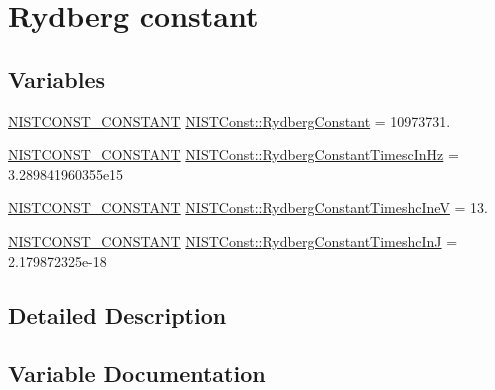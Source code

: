 \hypertarget{group___n_i_s_t_const-_rydberg_constant}{}\section{Rydberg constant}
\label{group___n_i_s_t_const-_rydberg_constant}
\subsection*{Variables}
\begin{DoxyCompactItemize}
\item 
\mbox{\hyperlink{group___n_i_s_t_const-_macros_ga2b0fc1d7452373f816175dd86ce26729}{N\+I\+S\+T\+C\+O\+N\+S\+T\+\_\+\+C\+O\+N\+S\+T\+A\+NT}} \mbox{\hyperlink{group___n_i_s_t_const-_rydberg_constant_ga5b5309c2cd540e1257add5555ea6b183}{N\+I\+S\+T\+Const\+::\+Rydberg\+Constant}} = 10973731.
\item 
\mbox{\hyperlink{group___n_i_s_t_const-_macros_ga2b0fc1d7452373f816175dd86ce26729}{N\+I\+S\+T\+C\+O\+N\+S\+T\+\_\+\+C\+O\+N\+S\+T\+A\+NT}} \mbox{\hyperlink{group___n_i_s_t_const-_rydberg_constant_gab36d2408665aafbb07042e7d1c945bb0}{N\+I\+S\+T\+Const\+::\+Rydberg\+Constant\+Timesc\+In\+Hz}} = 3.\+289841960355e15
\item 
\mbox{\hyperlink{group___n_i_s_t_const-_macros_ga2b0fc1d7452373f816175dd86ce26729}{N\+I\+S\+T\+C\+O\+N\+S\+T\+\_\+\+C\+O\+N\+S\+T\+A\+NT}} \mbox{\hyperlink{group___n_i_s_t_const-_rydberg_constant_ga25e0178ecaed69f077409ab82c45272d}{N\+I\+S\+T\+Const\+::\+Rydberg\+Constant\+Timeshc\+IneV}} = 13.
\item 
\mbox{\hyperlink{group___n_i_s_t_const-_macros_ga2b0fc1d7452373f816175dd86ce26729}{N\+I\+S\+T\+C\+O\+N\+S\+T\+\_\+\+C\+O\+N\+S\+T\+A\+NT}} \mbox{\hyperlink{group___n_i_s_t_const-_rydberg_constant_gaff757f4254c8c0db92b9aab166cfbeaf}{N\+I\+S\+T\+Const\+::\+Rydberg\+Constant\+Timeshc\+InJ}} = 2.\+179872325e-\/18
\end{DoxyCompactItemize}


\subsection{Detailed Description}


\subsection{Variable Documentation}
\mbox{\label{group___n_i_s_t_const-_rydberg_constant_ga5b5309c2cd540e1257add5555ea6b183}} 
